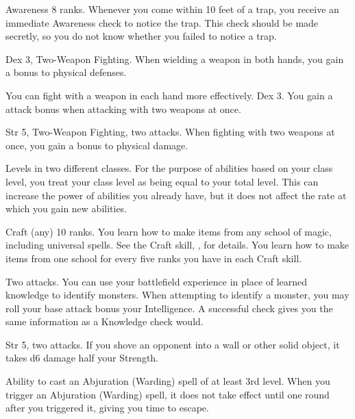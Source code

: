 \featpre Awareness 8 ranks.
\featben Whenever you come within 10 feet of a trap, you receive an immediate Awareness check to notice the trap.
This check should be made secretly, so you do not know whether you failed to notice a trap.

\featpres
Dex 3, Two-Weapon Fighting.
\featben When wielding a weapon in both hands, you gain a  bonus to physical defenses.

You can fight with a weapon in each hand more effectively.
\featpre Dex 3.
\featben You gain a  attack bonus when attacking with two weapons at once.

\featpres
Str 5, Two-Weapon Fighting, two attacks.
\featben When fighting with two weapons at once, you gain a  bonus to physical damage.

\featpre Levels in two different classes.
\featben For the purpose of abilities based on your class level, you treat your class level as being equal to your total level.
This can increase the power of abilities you already have, but it does not affect the rate at which you gain new abilities.

\featpre Craft (any) 10 ranks.
\featben You learn how to make items from any school of magic, including universal spells.
See the Craft skill, , for details.
You learn how to make items from one school for every five ranks you have in each Craft skill.

\featpre Two attacks.
\featben You can use your battlefield experience in place of learned knowledge to identify monsters.
When attempting to identify a monster, you may roll your base attack bonus \add your Intelligence.
A successful check gives you the same information as a Knowledge check would.

\featpre Str 5, two attacks.
\featben If you shove an opponent into a wall or other solid object, it takes d6 damage \add half your Strength.

\featpre Ability to cast an Abjuration (Warding) spell of at least 3rd level.
\featben When you trigger an Abjuration (Warding) spell, it does not take effect until one round after you triggered it, giving you time to escape.

